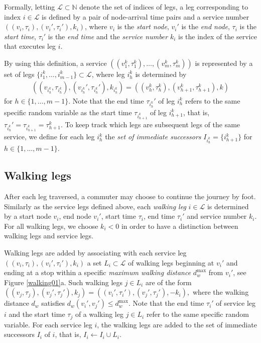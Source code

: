 \documentclass[dissertation,draft*]{aaltoseries}
\begin{document}
Formally, letting $\mathcal{L} \subset \mathbb{N}$ denote the set of indices of legs, 
a leg corresponding to index $i \in \mathcal{L}$ is defined by a pair of 
node-arrival time pairs and a service number $((v_i, \tau_i), (v_i', \tau_i'), k_i)$,
where $v_i$ is the \emph{start node}, $v_i'$ is the \emph{end node}, $\tau_i$ is the \emph{start time}, $\tau_i'$ 
is the \emph{end time} and the \emph{service number} $k_i$ is the index of the service that executes leg $i$.

By using this definition, a service  $((v_1^k, \tau_1^k), \ldots, (v_m^k, \tau_m^k))$ is
represented by a set of legs ${\{i_1^k,\ldots,i_{m-1}^k\} \subset \mathcal{L}}$, where leg $i_h^k$
is determined by 
\begin{align}
\label{legdefinition}
\left( (v_{i_h^k}, \tau_{i_h^k}), (v_{i_h^k}', \tau_{i_h^k}'),k_{i_h^k} \right) 
= \left((v_{h}^k, \tau_{h}^k),(v_{h+1}^k, \tau_{h+1}^k),k \right)
\end{align}
for $h \in \{1,\ldots , m-1\}$. 
Note that the end time $\tau_{i_h^k}'$ of leg $i_h^k$ refers to 
the same specific random variable as the start time $\tau_{i_{h+1}^k}$ of leg $i_{h+1}^k$, that is, 
$\tau_{i_h^k}' = \tau_{i_{h+1}^k} = \tau_{h+1}^k$. 
To keep track which legs are subsequent
legs of the same service, we define for each leg $i_h^k$ the \emph{set
of immediate successors} $I_{i_h^k} = \{ i_{h+1}^k\}$ for $h \in \{1,\ldots , m-1\}$.

\subsection{Walking legs}
After each leg traversed, a commuter may choose to continue the journey by foot. 
Similarly as the service legs defined above, each \emph{walking leg} $i \in \mathcal{L}$ 
is determined by a start node $v_i$, end node $v_i'$, start time $\tau_i$, end time $\tau_i'$ 
and service number $k_i$. For all walking legs, we choose $k_i < 0$ in order to have a distinction 
between walking legs and service legs.

Walking legs are added by associating with each service leg $((v_i, \tau_i), (v_i', \tau_i'),k_i)$ a set 
$L_i \subset \mathcal{L}$ of walking legs beginning at $v_i'$ and ending at a stop within a specific 
\emph{maximum walking distance} $d_w^{\max }$ from $v_i'$, see Figure \ref{walking01}a. Such walking legs $j \in L_i$
are of the form
$
\left((v_j, \tau_j), (v_j', \tau_j'),k_j\right)=\left( (v_i', \tau_i'),(v_j',\tau_j'),-k_i \right),
$
where the walking distance $d_w$ satisfies $d_w(v_i',v_j') \leq d_w^{\max }$. %
Note that the end time $\tau_i'$ of service leg $i$ and the start time $\tau_j$ of a walking leg $j \in L_i$
refer to the same specific random variable. 
For each service leg $i$, the walking legs are added to the set of immediate
successors $I_{i}$ of $i$, that is, $I_{i} \leftarrow I_{i} \cup L_i$.
\end{document}

